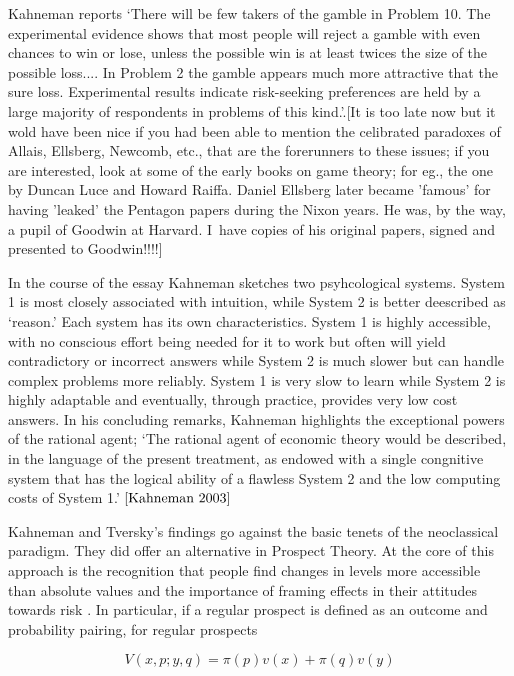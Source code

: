 \documentclass{ucthesis}
\begin{document}
Kahneman reports `There will be few takers of the gamble in Problem 10. The
experimental evidence shows that most people will reject a gamble with even
chances to win or lose, unless the possible win is at least twices the size
of the possible loss.... In Problem 2 the gamble appears much more
attractive that the sure loss. Experimental results indicate risk-seeking
preferences are held by a large majority of respondents in problems of this
kind.'\cite[ibid.]{Kahneman 2003}.{\LARGE [It is too late now but it wold
have been nice if you had been able to mention the celibrated paradoxes of
Allais, Ellsberg, Newcomb, etc., that are the forerunners to these issues;
if you are interested, look at some of the early books on game theory; for
eg., the one by Duncan Luce and Howard Raiffa. Daniel Ellsberg later became
'famous' for having 'leaked' the Pentagon papers during the Nixon years. He
was, by the way, a pupil of Goodwin at Harvard. I\ have copies of his
original papers, signed and presented to Goodwin!!!!]}

In the course of the essay Kahneman sketches two psyhcological systems.
System 1 is most closely associated with intuition, while System 2 is better
deescribed as `reason.' Each system has its own characteristics. System 1 is
highly accessible, with no conscious effort being needed for it to work but
often will yield contradictory or incorrect answers while System 2 is much
slower but can handle complex problems more reliably. System 1 is very slow
to learn while System 2 is highly adaptable and eventually, through
practice, provides very low cost answers. In his concluding remarks,
Kahneman highlights the exceptional powers of the rational agent; `The
rational agent of economic theory would be described, in the language of the
present treatment, as endowed with a single congnitive system that has the
logical ability of a flawless System 2 and the low computing costs of System
1.' $\cite[pp1469]{Kahneman 2003}$

Kahneman and Tversky's findings go against the basic tenets of the
neoclassical paradigm. They did offer an alternative in Prospect Theory. At
the core of this approach is the recognition that people find changes in
levels more accessible than absolute values and the importance of framing
effects in their attitudes towards risk \cite[1979]{prospect}. In
particular, if a regular prospect is defined as an outcome and probability
pairing, for regular prospects

\[
V\left( x,p;y,q\right) =\pi \left( p\right) v\left( x\right) +\pi \left(
q\right) v\left( y\right) 
\]
\end{document}
